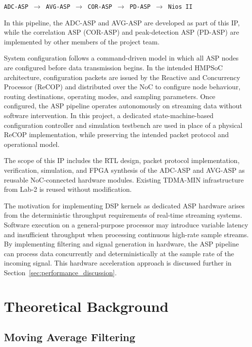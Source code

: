 \documentclass[10pt, a4paper]{article}
\begin{document}
\begin{center}
\texttt{ADC-ASP $\rightarrow$ AVG-ASP $\rightarrow$ COR-ASP $\rightarrow$ PD-ASP $\rightarrow$ Nios II}
\end{center}

In this pipeline, the ADC-ASP and AVG-ASP are developed as part of this IP, while the correlation ASP (COR-ASP) and peak-detection ASP (PD-ASP) are implemented by other members of the project team.

System configuration follows a command-driven model in which all ASP nodes are configured before data transmission begins. In the intended HMPSoC architecture, configuration packets are issued by the Reactive and Concurrency Processor (ReCOP) and distributed over the NoC to configure node behaviour, routing destinations, operating modes, and sampling parameters. Once configured, the ASP pipeline operates autonomously on streaming data without software intervention. In this project, a dedicated state-machine-based configuration controller and simulation testbench are used in place of a physical ReCOP implementation, while preserving the intended packet protocol and operational model.

The scope of this IP includes the RTL design, packet protocol implementation, verification, simulation, and FPGA synthesis of the ADC-ASP and AVG-ASP as reusable NoC-connected hardware modules. Existing TDMA-MIN infrastructure from Lab-2 is reused without modification.

The motivation for implementing DSP kernels as dedicated ASP hardware arises from the deterministic throughput requirements of real-time streaming systems. Software execution on a general-purpose processor may introduce variable latency and insufficient throughput when processing continuous high-rate sample streams. By implementing filtering and signal generation in hardware, the ASP pipeline can process data concurrently and deterministically at the sample rate of the incoming signal. This hardware acceleration approach is discussed further in Section~\ref{sec:performance_discussion}.

\newpage

\section{Theoretical Background}

\subsection{Moving Average Filtering}
\end{document}
